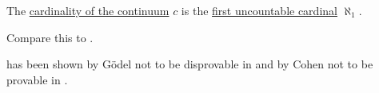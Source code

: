 \begin{conjecture}\label{hyp:continuum_hypothesis}
  The \hyperref[def:set_countability/continuum]{cardinality of the continuum} \( c \) is the \hyperref[def:set_countability/uncountable]{first uncountable cardinal} \( \aleph_1 \).

  Compare this to .
\end{conjecture}

\begin{remark}\label{rem:continuum_hypothesis}
   has been shown by G\"odel not to be disprovable in \hyperref[def:set]{} and by Cohen not to be provable in .
\end{remark}

